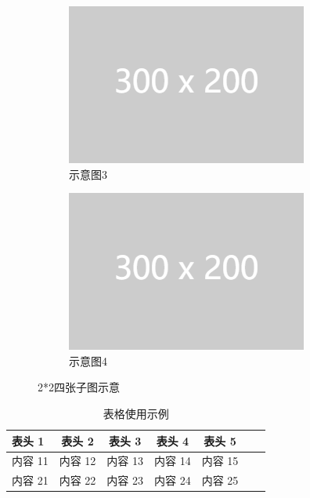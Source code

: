 \documentclass[zihao=-4]{ctexart}
\begin{document}
\begin{spacing}{1.5}
\begin{figure}[htbp]
\begin{subfigure}{0.48\textwidth}
    \includegraphics[width=\linewidth]{example-image-1.png}
    \caption{示意图3} \label{fig:8c}
  \end{subfigure}
  \hspace*{\fill}   %
  \begin{subfigure}{0.48\textwidth}
    \includegraphics[width=\linewidth]{example-image-1.png}
    \caption{示意图4} \label{fig:8d}
  \end{subfigure}
\caption{2*2四张子图示意} \label{fig:8}
\end{figure}


\begin{table}[t]
\centering
\caption{表格使用示例}
\begin{tabular}{|l||c|c|c|c|c|c|}
\hline
{\textbf{表头 1}}     &  表头 2 	    & 表头 3 	  & 表头 4     & 表头 5 		\\ \hline\hline
内容 11 		          & 内容 12				& 内容 13		& 内容 14 	 & 内容 15		\\ \hline
内容 21	              & 内容 22				& 内容 23		& 内容 24	   & 内容 25		\\ \hline



\end{tabular}
\end{table}
\end{spacing}
\end{document}
